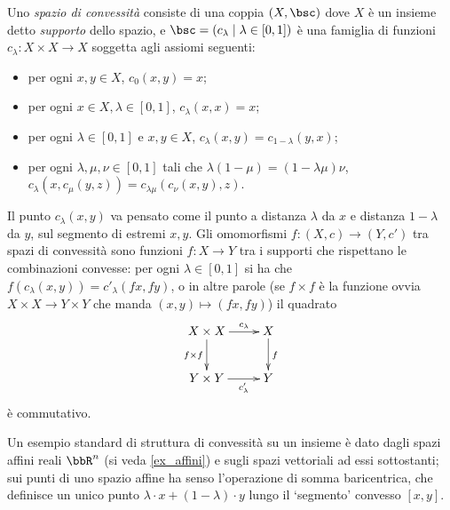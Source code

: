 \begin{example}\label{ex_cat_conv}
	Uno \emph{spazio di convessità} consiste di una coppia \((X,\bsc)\) dove \(X\) è un insieme detto \emph{supporto} dello spazio, e \(\bsc=(c_\lambda\mid \lambda\in[0,1])\) è una famiglia di funzioni \(c_\lambda : X\times X\to X\)	soggetta agli assiomi seguenti:
	\begin{itemize}
		\item per ogni \(x,y\in X\), \(c_0(x,y) = x\);
		\item per ogni \(x\in X,\lambda \in [0,1]\), \(c_\lambda(x,x) = x\);
		\item per ogni \(\lambda \in [0,1]\) e \(x,y\in X\), \(c_\lambda(x,y) = c_{1-\lambda}(y,x)\);
		\item per ogni \(\lambda,\mu,\nu \in [0,1]\) tali che \(\lambda(1 - \mu) = (1 - \lambda\mu)\nu\), \(c_\lambda(x, c_\mu(y,z)) = c_{\lambda\mu}(c_\nu(x,y),z)\).
	\end{itemize}
	Il punto \(c_\lambda(x,y)\) va pensato come il punto a distanza \(\lambda\) da \(x\) e distanza \(1-\lambda\) da \(y\), sul segmento di estremi \(x,y\). Gli omomorfismi \(f : (X,c) \to (Y,c')\) tra spazi di convessità sono funzioni \(f : X\to Y\) tra i supporti che rispettano le combinazioni convesse: per ogni \(\lambda \in [0,1]\) si ha che \(f(c_\lambda(x,y)) = c'_\lambda(fx, fy)\), o in altre parole (se \(f\times f\) è la funzione ovvia \(X\times X\to Y\times Y\) che manda \((x,y)\mapsto (fx,fy)\)) il quadrato
	\[\xymatrix{
		X \times X \ar[r]^-{c_\lambda}\ar[d]_{f\times f} & X \ar[d]^f\\
		Y \times Y \ar[r]_-{c'_\lambda} & Y
		}\]
	è commutativo.
\end{example}
Un esempio standard di struttura di convessità su un insieme è dato dagli spazi affini reali \(\bbR^n\) (si veda \ref{ex_affini}) e sugli spazi vettoriali ad essi sottostanti; sui punti di uno spazio affine ha senso l'operazione di somma baricentrica, che definisce un unico punto \(\lambda\cdot x + (1-\lambda)\cdot y\) lungo il  `segmento' convesso \([x,y]\).
